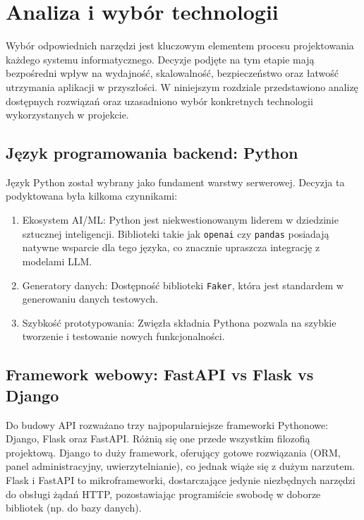 \chapter{Analiza i wybór technologii}

Wybór odpowiednich narzędzi jest kluczowym elementem procesu projektowania każdego systemu informatycznego. Decyzje podjęte na tym etapie mają bezpośredni wpływ na wydajność, skalowalność, bezpieczeństwo oraz łatwość utrzymania aplikacji w przyszłości. W niniejszym rozdziale przedstawiono analizę dostępnych rozwiązań oraz uzasadniono wybór konkretnych technologii wykorzystanych w projekcie.

\section*{Język programowania backend: Python}
Język Python został wybrany jako fundament warstwy serwerowej. Decyzja ta podyktowana była kilkoma czynnikami:
\begin{enumerate}
    \item Ekosystem AI/ML: Python jest niekwestionowanym liderem w dziedzinie sztucznej inteligencji. Biblioteki takie jak \texttt{openai} czy \texttt{pandas} posiadają natywne wsparcie dla tego języka, co znacznie upraszcza integrację z modelami \gls{LLM}.
    \item Generatory danych: Dostępność biblioteki \texttt{Faker}, która jest standardem w generowaniu danych testowych.
    \item Szybkość prototypowania: Zwięzła składnia Pythona pozwala na szybkie tworzenie i testowanie nowych funkcjonalności.
\end{enumerate}

\section*{Framework webowy: FastAPI vs Flask vs Django}
Do budowy \gls{API} rozważano trzy najpopularniejsze frameworki Pythonowe: Django\cite{django}, Flask\cite{flask} oraz FastAPI\cite{fastapi}.
Różnią się one przede wszystkim filozofią projektową. Django to duży framework, oferujący gotowe rozwiązania (ORM, panel administracyjny, uwierzytelnianie), co jednak wiąże się z dużym narzutem. Flask i FastAPI to mikroframeworki, dostarczające jedynie niezbędnych narzędzi do obsługi żądań HTTP, pozostawiając programiście swobodę w doborze bibliotek (np. do bazy danych).

